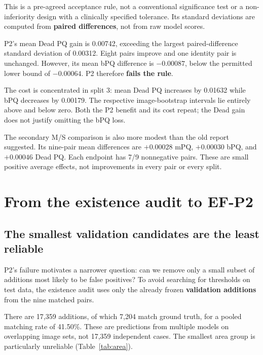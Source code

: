 \documentclass[11pt,a4paper]{article}
\begin{document}
This is a pre-agreed acceptance rule, not a conventional significance test or a non-inferiority design with a clinically specified tolerance. Its standard deviations are computed from \textbf{paired differences}, not from raw model scores.

P2's mean Dead PQ gain is 0.00742, exceeding the largest paired-difference standard deviation of 0.00312. Eight pairs improve and one identity pair is unchanged. However, its mean bPQ difference is $-0.00087$, below the permitted lower bound of $-0.00064$. P2 therefore \textbf{fails the rule}.

The cost is concentrated in split 3: mean Dead PQ increases by 0.01632 while bPQ decreases by 0.00179. The respective image-bootstrap intervals lie entirely above and below zero. Both the P2 benefit and its cost repeat; the Dead gain does not justify omitting the bPQ loss.

The secondary M/S comparison is also more modest than the old report suggested. Its nine-pair mean differences are $+0.00028$ mPQ, $+0.00030$ bPQ, and $+0.00046$ Dead PQ. Each endpoint has 7/9 nonnegative pairs. These are small positive average effects, not improvements in every pair or every split.

\section{From the existence audit to EF-P2}

\subsection{The smallest validation candidates are the least reliable}

P2's failure motivates a narrower question: can we remove only a small subset of additions most likely to be false positives? To avoid searching for thresholds on test data, the existence audit uses only the already frozen \textbf{validation additions} from the nine matched pairs.

There are 17,359 additions, of which 7,204 match ground truth, for a pooled matching rate of 41.50\%. These are predictions from multiple models on overlapping image sets, not 17,359 independent cases. The smallest area group is particularly unreliable (Table~\ref{tab:area}).
\end{document}
